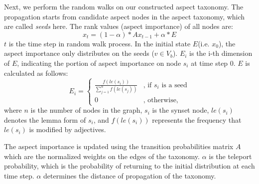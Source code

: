 Next, we perform the random walks on our constructed
aspect taxonomy.
The propagation starts from candidate aspect nodes in the 
aspect taxonomy, which are called {\em seeds} here.
%
The rank values (aspect importance) of all nodes are:
\begin{equation}
x_t = (1-\alpha)*Ax_{t-1} + \alpha*E
\label{eq:ppr}
\end{equation}
$t$ is the time step in random walk process.
In the initial state $E$(i.e. $x_0$), the aspect importance only distributes on the seeds ($v\in V_b$). 
$E_i$ is the i-th dimension of $E$, indicating
the portion of aspect importance on node $s_i$ 
at time step 0.
$E$ is calculated as follows:
\begin{equation}
E_i = 
\begin{cases}
\frac{f(le(s_i))}{\sum_{j=1}^{n} f(le(s_j))} &  \text{, if $s_i$ is a seed} \\
0 &  \text{, otherwise,}
\end{cases}
\end{equation}
where $n$ is the number of nodes in the graph,
$s_i$ is the synset node,
$le(s_i)$ denotes the lemma form of $s_i$,
and $f(le(s_i))$ represents the frequency that 
$le(s_i)$ is modified by adjectives.

The aspect importance is updated using the transition probabilities matrix 
$A$ which are the normalized weights on the edges of the taxonomy. 
$\alpha$ is the teleport probability, which is 
the probability of returning to the initial distribution
at each time step. 
$\alpha$ determines the distance of propagation of the taxonomy. 


